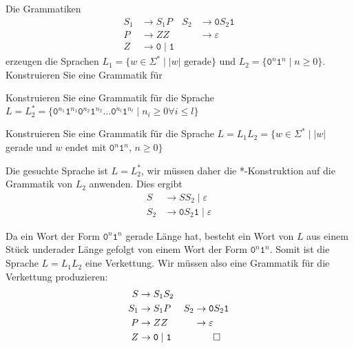 Die Grammatiken
\begin{align*}
S_1 & \to S_1P                      & S_2 & \to \texttt{0}S_2\texttt{1}    \\
P   & \to ZZ                        &     & \to \varepsilon                \\
Z   & \to \texttt{0}\mid\texttt{1}  &     &                               
\end{align*}
erzeugen die Sprachen $L_1=\{w\in\Sigma^*\mid  \text{$|w|$ gerade}\}$
und $L_2=\{\texttt{0}^n\texttt{1}^n \mid n\ge 0\}$.
Konstruieren Sie eine Grammatik für
\begin{teilaufgaben}
\item Konstruieren Sie eine Grammatik für die Sprache $L=L_2^*=\{
\texttt{0}^{n_1}\texttt{1}^{n_1}
\texttt{0}^{n_2}\texttt{1}^{n_2}
\dots
\texttt{0}^{n_l}\texttt{1}^{n_l}
\mid
n_i\ge 0\forall i\le l
\}$
\item Konstruieren Sie eine Grammatik für die Sprache $L=L_1L_2=\{
w\in\Sigma^* \mid
|w|$ gerade und $w$ endet mit $\texttt{0}^n\texttt{1}^n$, $n\ge 0 \}$
\end{teilaufgaben}

\begin{loesung}
\begin{teilaufgaben}
\item
Die gesuchte Sprache ist $L=L_2^*$, wir müssen daher die *-Konstruktion
auf die Grammatik von $L_2$ anwenden.
Dies ergibt 
\begin{align*}
S   & \to SS_2 \mid \varepsilon  \\
S_2 & \to \texttt{0}S_2\texttt{1} \mid \varepsilon
\end{align*}
\item
Da ein Wort der Form $\texttt{0}^n\texttt{1}^n$ gerade Länge hat, besteht
ein Wort von $L$ aus einem Stück underader Länge gefolgt von einem
Wort der Form $\texttt{0}^n\texttt{1}^n$.
Somit ist die Sprache $L=L_1L_2$ eine Verkettung.
Wir müssen also eine Grammatik für die Verkettung produzieren:
\begin{align*}
S   & \to S_1S_2                    &     &                                \\
S_1 & \to S_1P                      & S_2 & \to \texttt{0}S_2\texttt{1}    \\
P   & \to ZZ                        &     & \to \varepsilon                \\
Z   & \to \texttt{0}\mid\texttt{1}  &     &                               
\qedhere
\end{align*}
\end{teilaufgaben}
\end{loesung}




